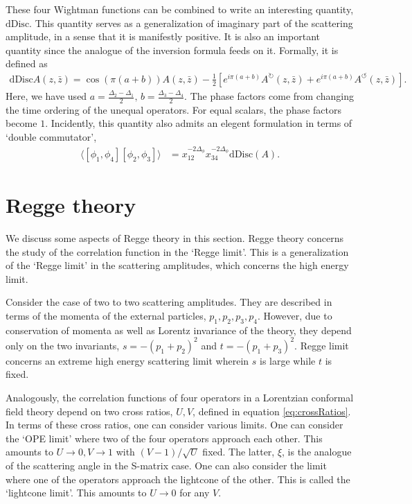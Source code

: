 These four Wightman functions can be combined to write an interesting quantity, $ \text{dDisc} $.
This quantity serves as a generalization of imaginary part of the scattering amplitude, in a sense that it is manifestly positive.
It is also an important quantity since the analogue of the inversion formula feeds on it.
Formally, it is defined as
\begin{align}
  \text{dDisc} A \left( z,\bar{z} \right)  =
  \cos \left( \pi\left( a+b \right) \right) A \left( z,\bar{z} \right)
  -\frac{1}{2}\left[
  e^{i\pi \left( a+b \right)}A^{\circlearrowright}\left( z,\bar{z} \right)
  +e^{i\pi \left( a+b \right)} A^{\circlearrowleft}\left( z,\bar{z} \right)
  \right]
  .\end{align}
Here, we have used $ a = \frac{\Delta_2 - \Delta_1  }{2}, \, b = \frac{\Delta_3 - \Delta_4 }{2}$.
The phase factors come from changing the time ordering of the unequal operators.
For equal scalars, the phase factors become $ 1 $.
Incidently, this quantity also admits an elegent formulation in terms of `double commutator',
\begin{align}
  \langle \left[ \phi_1, \phi_4 \right] \left[ \phi_2,\phi_3  \right]\rangle & =
  x_{12}^{-2\Delta_\phi}
  x_{34}^{-2\Delta_\phi}
  \text{dDisc}\left( A \right)
  .\end{align}







\section{Regge theory}
We discuss some aspects of Regge theory in this section.
Regge theory concerns the study of the correlation function in the `Regge limit'.
This is a generalization of the `Regge limit' in the scattering amplitudes, which concerns the high energy limit.

Consider the case of two to two scattering amplitudes.
They are described in terms of the momenta of the external particles, $p_1, p_2, p_3, p_4$.
However, due to conservation of momenta as well as Lorentz invariance of the theory, they depend only on the two invariants, $s =-\left( p_1 + p_2 \right)^2$ and $ t =-\left( p_1 + p_3 \right)^2 $.
Regge limit concerns an extreme high energy scattering limit wherein $ s $ is large while $ t $ is fixed.

Analogously, the correlation functions of four operators in a Lorentzian conformal field theory depend on two cross ratios, $ U,V $, defined in equation \ref{eq:crossRatios}.
In terms of these cross ratios, one can consider various limits.
One can consider the `OPE limit' where two of the four operators approach each other.
This amounts to $ U \rightarrow 0, V \rightarrow 1 $ with $ \left( V-1 \right)/\sqrt{U} $ fixed.
The latter, $ \xi $, is the analogue of the scattering angle in the S-matrix case.
One can also consider the limit where one of the operators approach the lightcone of the other.
This is called the `lightcone limit'.
This amounts to $ U\rightarrow 0 $ for any $ V $.

